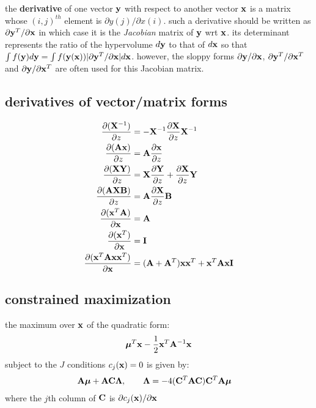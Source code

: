 \documentclass[12pt]{article}
\begin{document}

\noindent
the {\bf derivative} of one vector ${\mathbf y}$ with respect to
another vector ${\mathbf x}$ is a matrix whose $(i,j)^{th}$ element is
$\partial y(j)/ \partial x(i)$. such a derivative should be written as
$\partial {\mathbf y}^T / \partial {\mathbf x}$
 in which case it is the {\em
Jacobian} matrix of ${\mathbf y}$ wrt ${\mathbf x}$. its determinant 
represents the ratio of the hypervolume $d{\mathbf y}$ to that of
$d{\mathbf x}$ so that 
$\int f({\mathbf y}) d{\mathbf y} = \int f({\mathbf y}({\mathbf x})) |\partial {\mathbf y}^T /\partial {\mathbf x}|d{\mathbf x}$. 
however, the sloppy forms 
$\partial {\mathbf y} / \partial {\mathbf x}$,
$\partial {\mathbf y}^T / \partial {\mathbf x}^T$ and
$\partial {\mathbf y} / \partial {\mathbf x}^T$ are often used for this Jacobian matrix.

\subsection{derivatives of vector/matrix forms}
\begin{align}
\frac{\partial ({\mathbf X}^{-1})}{\partial z} &= -
{\mathbf X}^{-1}  \frac{\partial {\mathbf X}}{\partial z} {\mathbf X}^{-1} \\
\frac{\partial ({\mathbf A} {\mathbf x})}{\partial z} &= {\mathbf A}  
\frac{\partial {\mathbf x}}{\partial z}\\
\frac{\partial ({\mathbf X} {\mathbf Y})}{\partial z} &=
{\mathbf X}  \frac{\partial {\mathbf Y}}{\partial z} +
\frac{\partial {\mathbf X}}{\partial z} {\mathbf Y} \\ 
\frac{\partial ({\mathbf A} {\mathbf X} {\mathbf B})}{\partial z} &= {\mathbf A} 
\frac{\partial {\mathbf X}}{\partial z} {\mathbf B}\\  
\frac{\partial ({\mathbf x}^T{\mathbf A})}{\partial {\mathbf x}} &= {\mathbf A} \\ 
\frac{\partial ({\mathbf x}^T)}{\partial {\mathbf x}} &= {\mathbf I} \\
\frac{\partial ({\mathbf x}^T{\mathbf A}{\mathbf x}{\mathbf x}^T)}{\partial {\mathbf x}} &= 
({\mathbf A}+{\mathbf A}^T){\mathbf x}{\mathbf x}^T+{\mathbf x}^T{\mathbf A}{\mathbf x}{\mathbf I}
\end{align}

\subsection{constrained maximization}
the maximum over ${\mathbf x}$ of the quadratic form:
\begin{align}
{\boldsymbol \mu}^T{\mathbf x} - \frac{1}{2}{\mathbf x}^T{\mathbf A}^{-1}{\mathbf x}
\end{align}
subject to the $J$ conditions $c_j({\mathbf x})=0$  is given by:
\begin{align}
{\mathbf A}{\boldsymbol \mu} + {\mathbf A}{\mathbf C}{\boldsymbol \Lambda}, \qquad {\boldsymbol \Lambda} & = -4({\mathbf C}^T{\mathbf A}{\mathbf C}){\mathbf C}^T{\mathbf A}{\boldsymbol \mu}
\end{align}
where the $j$th column of ${\mathbf C}$ is $\partial c_j({\mathbf x}) / \partial {\mathbf x}$
\end{document}
